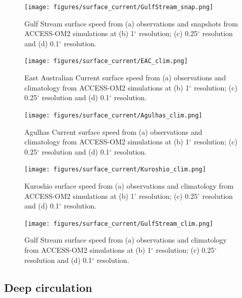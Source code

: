 \documentclass[11pt]{article}
\newcommand{\FIXME}[1]{\note{\textcolor{red}{\textsf{\textbf{FIXME: #1}}}}}
\begin{document}
\begin{figure}[htp]
\texttt{[image: figures/surface\_current/GulfStream\_snap.png]}
\caption{Gulf Stream surface speed from (a) observations \citep[1979--2015 mean from drifters at 15\,m;][]{LaurindoMarianoLumpkin2017a} and snapshots \FIXME{daily mean? what date?} from ACCESS-OM2 simulations at (b) 1$^\circ$ resolution; (c) 0.25$^\circ$ resolution and (d) 0.1$^\circ$ resolution.}
\label{F:GulfStreamsnap}
\end{figure}

\begin{figure}[htp]
\texttt{[image: figures/surface\_current/EAC\_clim.png]}
\caption{East Australian Current surface speed from (a) observations \citep[1979--2015 mean from drifters at 15\,m;][]{LaurindoMarianoLumpkin2017a} and climatology from ACCESS-OM2 simulations at (b) 1$^\circ$ resolution; (c) 0.25$^\circ$ resolution and (d) 0.1$^\circ$ resolution.}
\label{F:EACclim}
\end{figure}

\begin{figure}[htp]
\texttt{[image: figures/surface\_current/Agulhas\_clim.png]}
\caption{Agulhas Current surface speed from (a) observations \citep[1979--2015 mean from drifters at 15\,m;][]{LaurindoMarianoLumpkin2017a} and climatology from ACCESS-OM2 simulations at (b) 1$^\circ$ resolution; (c) 0.25$^\circ$ resolution and (d) 0.1$^\circ$ resolution.}
\label{F:Agulhasclim}
\end{figure}

\begin{figure}[htp]
\texttt{[image: figures/surface\_current/Kuroshio\_clim.png]}
\caption{Kuroshio surface speed from (a) observations \citep[1979--2015 mean from drifters at 15\,m;][]{LaurindoMarianoLumpkin2017a} and climatology from ACCESS-OM2 simulations at (b) 1$^\circ$ resolution; (c) 0.25$^\circ$ resolution and (d) 0.1$^\circ$ resolution.}
\label{F:Kuroshioclim}
\end{figure}

\begin{figure}[htp]
\texttt{[image: figures/surface\_current/GulfStream\_clim.png]}
\caption{Gulf Stream surface speed from (a) observations \citep[1979--2015 mean from drifters at 15\,m;][]{LaurindoMarianoLumpkin2017a} and climatology from ACCESS-OM2 simulations at (b) 1$^\circ$ resolution; (c) 0.25$^\circ$ resolution and (d) 0.1$^\circ$ resolution.}
\label{F:GulfStreamclim}
\end{figure}


\subsection{Deep circulation}
\citet{OllitraultColindeVerdiere2014a}
\end{document}
